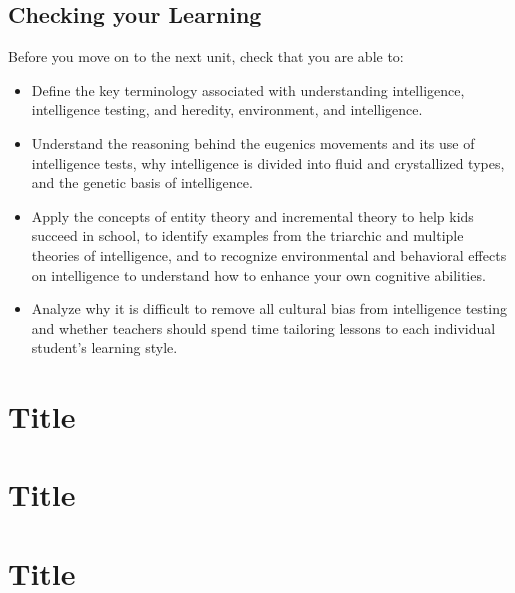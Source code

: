 \documentclass[
]{book}
\providecommand{\tightlist}{%
  \setlength{\itemsep}{0pt}\setlength{\parskip}{0pt}}
\begin{document}
\hypertarget{checking-your-learning-1}{%
\section*{Checking your Learning}\label{checking-your-learning-1}}

\begin{progress}
Before you move on to the next unit, check that you are able to:

\begin{itemize}
\tightlist
\item
  Define the key terminology associated with understanding intelligence, intelligence testing, and heredity, environment, and intelligence.\\
\item
  Understand the reasoning behind the eugenics movements and its use of intelligence tests, why intelligence is divided into fluid and crystallized types, and the genetic basis of intelligence.\\
\item
  Apply the concepts of entity theory and incremental theory to help kids succeed in school, to identify examples from the triarchic and multiple theories of intelligence, and to recognize environmental and behavioral effects on intelligence to understand how to enhance your own cognitive abilities.\\
\item
  Analyze why it is difficult to remove all cultural bias from intelligence testing and whether teachers should spend time tailoring lessons to each individual student's learning style.
\end{itemize}
\end{progress}

\hypertarget{title}{%
\chapter{Title}\label{title}}

\hypertarget{title-1}{%
\chapter{Title}\label{title-1}}

\hypertarget{title-2}{%
\chapter{Title}\label{title-2}}
\end{document}
